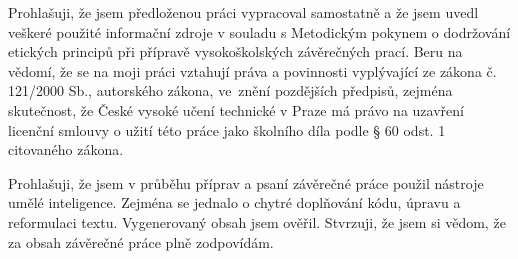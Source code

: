 \documentclass[czech,master,unicode]{ctufit-thesis}
\begin{document}
\begin{declarationpage}
Prohlašuji, že jsem předloženou práci vypracoval samostatně a že jsem uvedl veškeré
použité informační zdroje v souladu s Metodickým pokynem o dodržování etických
principů při přípravě vysokoškolských závěrečných prací.
Beru na vědomí, že se na moji práci vztahují práva a povinnosti vyplývající ze zákona
č. 121/2000 Sb., autorského zákona, ve~znění pozdějších předpisů, zejména
skutečnost, že České vysoké učení technické v Praze má právo na uzavření licenční
smlouvy o užití této práce jako školního díla podle § 60 odst. 1 citovaného zákona.

\vspace{1em}

Prohlašuji, že jsem v průběhu příprav a psaní závěrečné práce použil nástroje umělé inteligence.
Zejména se jednalo o chytré doplňování kódu, úpravu a reformulaci textu.
Vygenerovaný obsah jsem ověřil. 
Stvrzuji, že jsem si vědom, že za obsah závěrečné práce plně zodpovídám. 
\end{declarationpage}

\printabstractpage %

\tableofcontents %
\listoffigures %
\begingroup
\let\clearpage\relax
\listoftables %
\thectufitlistingscommand
\endgroup

\chapter{\thectufitabbreviationlabel}
 

\end{document}
